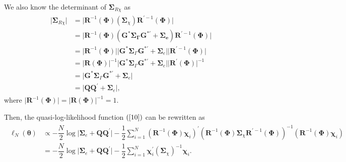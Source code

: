 \documentclass[12pt,a4paper,hyperref]{article}
\begin{document}
We also know the determinant of  $\boldsymbol{\Sigma}_{R \chi}$ as
\begin{align}
\begin{split}
\vert\boldsymbol{\Sigma}_{R \chi}\vert &=\vert \boldsymbol{R}^{-1}(\boldsymbol{\Phi}) \left(\boldsymbol{\Sigma}_{\chi} \right)\boldsymbol{R}^{' -1}(\boldsymbol{\Phi})    \vert  \\
&=\vert \boldsymbol{R}^{-1}(\boldsymbol{\Phi}) (\boldsymbol{G}^{\ast} \boldsymbol{\Sigma_{\Gamma}} \boldsymbol{G}^{\ast'}+\boldsymbol{\Sigma_{e}} )\boldsymbol{R}^{' -1}  (\boldsymbol{\Phi})  \vert \\
&=\vert \boldsymbol{R}^{-1}(\boldsymbol{\Phi}) \vert \vert \boldsymbol{G}^{\ast} \boldsymbol{\Sigma}_{\Gamma} \boldsymbol{G}^{\ast'}+\boldsymbol{\Sigma}_{e}  \vert  \vert  \boldsymbol{R}^{' -1}(\boldsymbol{\Phi})  \vert \\
&=\vert \boldsymbol{R}(\boldsymbol{\Phi}) \vert^{-1} \vert  \boldsymbol{G}^{\ast} \boldsymbol{\Sigma}_{\Gamma}\boldsymbol{G}^{\ast'}+\boldsymbol{\Sigma}_{e}  \vert  \vert  \boldsymbol{R}^{'}(\boldsymbol{\Phi})  \vert^{-1} \\
&= \vert \boldsymbol{G}^{\ast} \boldsymbol{\Sigma}_{\Gamma} \boldsymbol{G}^{\ast'}+\boldsymbol{\Sigma}_{e} \vert\\
&=\vert \boldsymbol{Q}\boldsymbol{Q}^{'} +\boldsymbol{\Sigma}_{e} \vert ,
\end{split}
\end{align}
 where $ \vert \boldsymbol{R}^{-1}(\boldsymbol{\Phi}) \vert=\vert \boldsymbol{R}(\boldsymbol{\Phi}) \vert^{-1}=1.$


Then, the quasi-log-likelihood function $(\ref{10})$ can be rewritten as
\begin{align}
\begin{split}
\ell_{N}\left(\boldsymbol{\theta}\right)&\propto -\dfrac{N}{2} \log \vert \boldsymbol{\Sigma}_{e}+\boldsymbol{QQ}^{'}     \vert -\dfrac{1}{2}\sum^{N}_{i=1}  (\boldsymbol{R}^{-1}(\boldsymbol{\Phi}) \boldsymbol{\chi}_{i})^{'} (\boldsymbol{R}^{-1}(\boldsymbol{\Phi})\boldsymbol{\Sigma}_{\chi} \boldsymbol{R}^{'-1}(\boldsymbol{\Phi}))^{-1}    ( \boldsymbol{R}^{-1}(\boldsymbol{\Phi})\boldsymbol{\chi}_{i} ) \\
&= -\dfrac{N}{2} \log\vert \boldsymbol{\Sigma}_{e}+\boldsymbol{QQ}^{'}     \vert -\dfrac{1}{2}\sum^{N}_{i=1} \boldsymbol{\chi}^{'}_{i} \left( \boldsymbol{\Sigma}_{\chi}  \right)^{-1}      \boldsymbol{\chi}_{i}.  \label{13}
\end{split}
\end{align}
\end{document}

